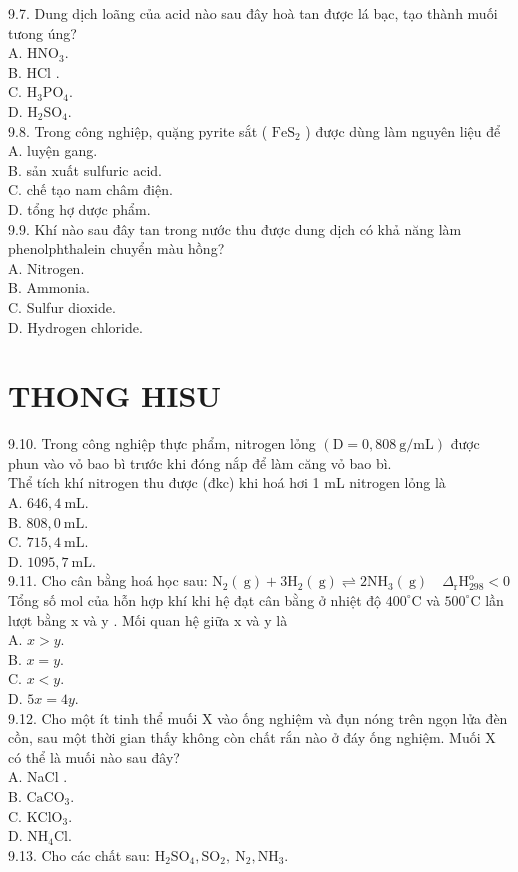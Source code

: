 \documentclass[10pt]{article}
\begin{document}
9.7. Dung dịch loãng của acid nào sau đây hoà tan được lá bạc, tạo thành muối tưong úng?\\
A. $\mathrm{HNO}_{3}$.\\
B. HCl .\\
C. $\mathrm{H}_{3} \mathrm{PO}_{4}$.\\
D. $\mathrm{H}_{2} \mathrm{SO}_{4}$.\\
9.8. Trong công nghiệp, quặng pyrite sắt ( $\mathrm{FeS}_{2}$ ) được dùng làm nguyên liệu để\\
A. luyện gang.\\
B. sản xuất sulfuric acid.\\
C. chế tạo nam châm điện.\\
D. tổng hợ dược phẩm.\\
9.9. Khí nào sau đây tan trong nước thu được dung dịch có khả năng làm phenolphthalein chuyển màu hồng?\\
A. Nitrogen.\\
B. Ammonia.\\
C. Sulfur dioxide.\\
D. Hydrogen chloride.

\section*{THONG HISU}
9.10. Trong công nghiệp thực phẩm, nitrogen lỏng $(\mathrm{D}=0,808 \mathrm{~g} / \mathrm{mL})$ được phun vào vỏ bao bì trước khi đóng nắp để làm căng vỏ bao bì.\\
Thể tích khí nitrogen thu được (đkc) khi hoá hơi 1 mL nitrogen lỏng là\\
A. $646,4 \mathrm{~mL}$.\\
B. $808,0 \mathrm{~mL}$.\\
C. $715,4 \mathrm{~mL}$.\\
D. $1095,7 \mathrm{~mL}$.\\
9.11. Cho cân bằng hoá học sau: $\mathrm{N}_{2}(\mathrm{~g})+3 \mathrm{H}_{2}(\mathrm{~g}) \rightleftharpoons 2 \mathrm{NH}_{3}(\mathrm{~g}) \quad \Delta_{\mathrm{r}} \mathrm{H}_{298}^{\mathrm{o}}<0$ Tổng số mol của hỗn hợp khí khi hệ đạt cân bằng ở nhiệt độ $400^{\circ} \mathrm{C}$ và $500^{\circ} \mathrm{C}$ lần lượt bằng x và y . Mối quan hệ giữa x và y là\\
A. $x>y$.\\
B. $x=y$.\\
C. $x<y$.\\
D. $5 x=4 y$.\\
9.12. Cho một ít tinh thể muối X vào ống nghiệm và đụn nóng trên ngọn lửa đèn cồn, sau một thời gian thấy không còn chất rắn nào ở đáy ống nghiệm. Muối X có thể là muối nào sau đây?\\
A. NaCl .\\
B. $\mathrm{CaCO}_{3}$.\\
C. $\mathrm{KClO}_{3}$.\\
D. $\mathrm{NH}_{4} \mathrm{Cl}$.\\
9.13. Cho các chất sau: $\mathrm{H}_{2} \mathrm{SO}_{4}, \mathrm{SO}_{2}, \mathrm{~N}_{2}, \mathrm{NH}_{3}$.
\end{document}
